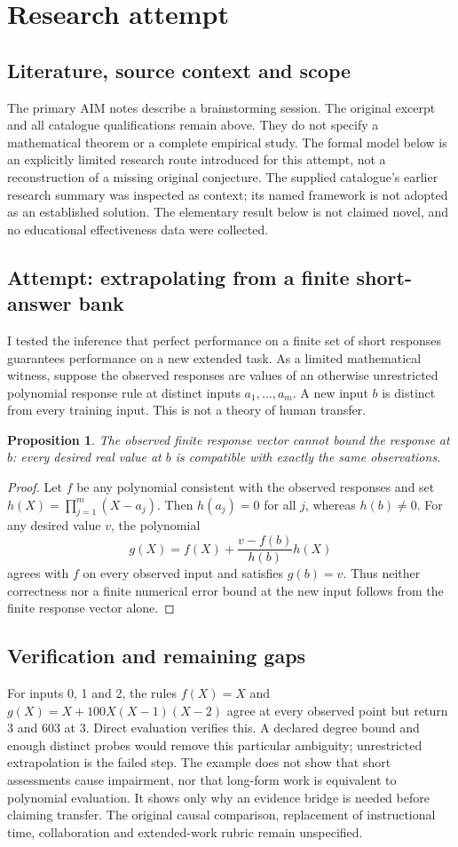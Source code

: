 \documentclass[11pt]{article}
\newtheorem{proposition}{Proposition}
\begin{document}
\section{Research attempt}
\subsection{Literature, source context and scope}
The primary AIM notes describe a brainstorming session. The original excerpt and all catalogue qualifications remain above. They do not specify a mathematical theorem or a complete empirical study. The formal model below is an explicitly limited research route introduced for this attempt, not a reconstruction of a missing original conjecture. The supplied catalogue's earlier research summary was inspected as context; its named framework is not adopted as an established solution. The elementary result below is not claimed novel, and no educational effectiveness data were collected.

\subsection{Attempt: extrapolating from a finite short-answer bank}
I tested the inference that perfect performance on a finite set of short responses guarantees performance on a new extended task. As a limited mathematical witness, suppose the observed responses are values of an otherwise unrestricted polynomial response rule at distinct inputs $a_1,\ldots,a_m$. A new input $b$ is distinct from every training input. This is not a theory of human transfer.
\begin{proposition}
The observed finite response vector cannot bound the response at $b$: every desired real value at $b$ is compatible with exactly the same observations.
\end{proposition}
\begin{proof}
Let $f$ be any polynomial consistent with the observed responses and set $h(X)=\prod_{j=1}^m(X-a_j)$. Then $h(a_j)=0$ for all $j$, whereas $h(b)\ne0$. For any desired value $v$, the polynomial
\[
g(X)=f(X)+\frac{v-f(b)}{h(b)}h(X)
\]
agrees with $f$ on every observed input and satisfies $g(b)=v$. Thus neither correctness nor a finite numerical error bound at the new input follows from the finite response vector alone.
\end{proof}
\subsection{Verification and remaining gaps}
For inputs 0, 1 and 2, the rules $f(X)=X$ and $g(X)=X+100X(X-1)(X-2)$ agree at every observed point but return 3 and 603 at 3. Direct evaluation verifies this. A declared degree bound and enough distinct probes would remove this particular ambiguity; unrestricted extrapolation is the failed step. The example does not show that short assessments cause impairment, nor that long-form work is equivalent to polynomial evaluation. It shows only why an evidence bridge is needed before claiming transfer. The original causal comparison, replacement of instructional time, collaboration and extended-work rubric remain unspecified.
\end{document}
